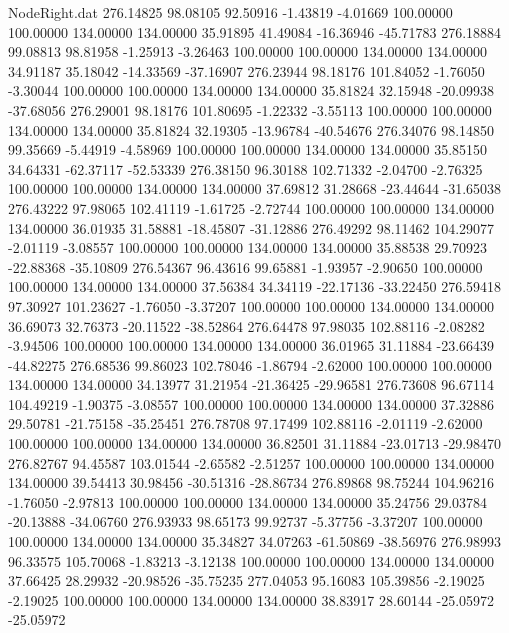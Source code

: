 \begin{filecontents}{NodeRight.dat}
 276.14825   98.08105   92.50916    -1.43819   -4.01669  100.00000  100.00000  134.00000  134.00000   35.91895   41.49084  -16.36946  -45.71783
 276.18884   99.08813   98.81958    -1.25913   -3.26463  100.00000  100.00000  134.00000  134.00000   34.91187   35.18042  -14.33569  -37.16907
 276.23944   98.18176  101.84052    -1.76050   -3.30044  100.00000  100.00000  134.00000  134.00000   35.81824   32.15948  -20.09938  -37.68056
 276.29001   98.18176  101.80695    -1.22332   -3.55113  100.00000  100.00000  134.00000  134.00000   35.81824   32.19305  -13.96784  -40.54676
 276.34076   98.14850   99.35669    -5.44919   -4.58969  100.00000  100.00000  134.00000  134.00000   35.85150   34.64331  -62.37117  -52.53339
 276.38150   96.30188  102.71332    -2.04700   -2.76325  100.00000  100.00000  134.00000  134.00000   37.69812   31.28668  -23.44644  -31.65038
 276.43222   97.98065  102.41119    -1.61725   -2.72744  100.00000  100.00000  134.00000  134.00000   36.01935   31.58881  -18.45807  -31.12886
 276.49292   98.11462  104.29077    -2.01119   -3.08557  100.00000  100.00000  134.00000  134.00000   35.88538   29.70923  -22.88368  -35.10809
 276.54367   96.43616   99.65881    -1.93957   -2.90650  100.00000  100.00000  134.00000  134.00000   37.56384   34.34119  -22.17136  -33.22450
 276.59418   97.30927  101.23627    -1.76050   -3.37207  100.00000  100.00000  134.00000  134.00000   36.69073   32.76373  -20.11522  -38.52864
 276.64478   97.98035  102.88116    -2.08282   -3.94506  100.00000  100.00000  134.00000  134.00000   36.01965   31.11884  -23.66439  -44.82275
 276.68536   99.86023  102.78046    -1.86794   -2.62000  100.00000  100.00000  134.00000  134.00000   34.13977   31.21954  -21.36425  -29.96581
 276.73608   96.67114  104.49219    -1.90375   -3.08557  100.00000  100.00000  134.00000  134.00000   37.32886   29.50781  -21.75158  -35.25451
 276.78708   97.17499  102.88116    -2.01119   -2.62000  100.00000  100.00000  134.00000  134.00000   36.82501   31.11884  -23.01713  -29.98470
 276.82767   94.45587  103.01544    -2.65582   -2.51257  100.00000  100.00000  134.00000  134.00000   39.54413   30.98456  -30.51316  -28.86734
 276.89868   98.75244  104.96216    -1.76050   -2.97813  100.00000  100.00000  134.00000  134.00000   35.24756   29.03784  -20.13888  -34.06760
 276.93933   98.65173   99.92737    -5.37756   -3.37207  100.00000  100.00000  134.00000  134.00000   35.34827   34.07263  -61.50869  -38.56976
 276.98993   96.33575  105.70068    -1.83213   -3.12138  100.00000  100.00000  134.00000  134.00000   37.66425   28.29932  -20.98526  -35.75235
 277.04053   95.16083  105.39856    -2.19025   -2.19025  100.00000  100.00000  134.00000  134.00000   38.83917   28.60144  -25.05972  -25.05972

\end{filecontents}
